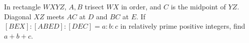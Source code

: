 In rectangle $WXYZ$, $A,B$ trisect $WX$ in order, and $C$ is the midpoint of $YZ$. Diagonal $XZ$ meets $AC$ at $D$ and $BC$ at $E$. If $[BEX]:[ABED]:[DEC]=a:b:c$ in relatively prime positive integers, find $a+b+c$.
